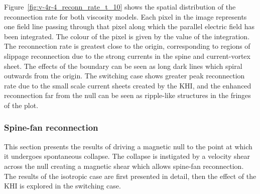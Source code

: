 Figure~\ref{fig:v-4r-4_reconn_rate_t_10} shows the spatial distribution of the reconnection rate for both viscosity models. Each pixel in the image represents one field line passing through that pixel along which the parallel electric field has been integrated. The colour of the pixel is given by the value of the integration. The reconnection rate is greatest close to the origin, corresponding to regions of slippage reconnection due to the strong currents in the spine and current-vortex sheet. The effects of the boundary can be seen as long dark lines which spiral outwards from the origin. The switching case shows greater peak reconnection rate due to the small scale current sheets created by the KHI, and the enhanced reconnection far from the null can be seen as ripple-like structures in the fringes of the plot.

\subsubsection{Spine-fan reconnection}

This section presents the results of driving a magnetic null to the point at which it undergoes spontaneous collapse. The collapse is instigated by a velocity shear across the null creating a magnetic shear which allows spine-fan reconnection. The results of the isotropic case are first presented in detail, then the effect of the KHI is explored in the switching case.

